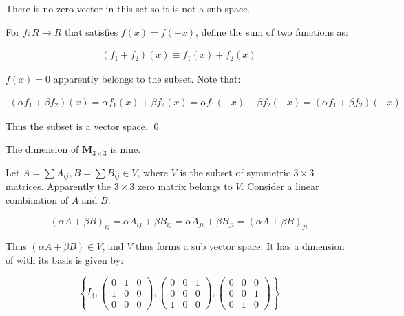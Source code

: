 \documentclass[12pt]{article}
\begin{document}
There is no zero vector in this set so it is not a sub space.

For $f:R \to R$ that satisfies $f(x) = f(-x)$, define the sum of two functions as:

\begin{equation}
    \begin{split}
        (f_{1} + f_{2})(x) \equiv f_{1}(x) + f_{2}(x)
    \end{split}
\end{equation}

$f(x) = 0$ apparently belongs to the subset. Note that:

\begin{equation}
    \begin{split}
        (\alpha f_{1} + \beta f_{2})(x) = \alpha f_{1}(x) + \beta f_{2}(x) = \alpha f_{1}(-x) + \beta f_{2}(-x) = (\alpha f_{1} + \beta f_{2})(-x)
    \end{split}
\end{equation}

Thus the subset is a vector space.
\qed


The dimension of $\mathbf{M}_{3 \times 3}$ is nine.

Let $A = \sum A_{ij}, B = \sum B_{ij} \in V$, where $V$ is the subset of symmetric $3 \times 3$ matrices. Apparently the $3 \times 3$ zero matrix belongs to $V$. Consider a linear combination of $A$ and $B$:

\begin{equation}
    (\alpha A + \beta B)_{ij} = \alpha A_{ij} + \beta B_{ij} = \alpha A_{ji} + \beta B_{ji} = (\alpha A + \beta B)_{ji}
\end{equation}

Thus $(\alpha A + \beta B) \in V$, and $V$ thus forms a sub vector space. It has a dimension of  with its basis is given by:

\begin{equation}
    \left\{
    I_{3},
    \begin{pmatrix}
        0 & 1 & 0 \\
        1 & 0 & 0 \\
        0 & 0 & 0
    \end{pmatrix},
    \begin{pmatrix}
        0 & 0 & 1 \\
        0 & 0 & 0 \\
        1 & 0 & 0
    \end{pmatrix},
    \begin{pmatrix}
        0 & 0 & 0 \\
        0 & 0 & 1 \\
        0 & 1 & 0
    \end{pmatrix}
    \right\}
\end{equation}
\end{document}
